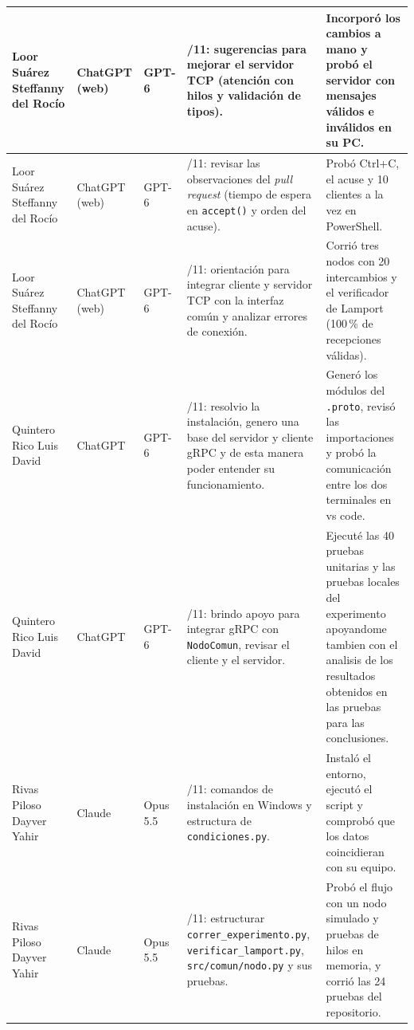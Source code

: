 {\begin{longtable}{@{}>{\raggedright\arraybackslash}p{2.2cm}>{\raggedright\arraybackslash}p{2.2cm}>{\raggedright\arraybackslash}p{1.6cm}>{\raggedright\arraybackslash}p{3.9cm}>{\raggedright\arraybackslash}p{3.9cm}@{}}
  \midrule
  Loor Suárez Steffanny del Rocío & ChatGPT (web) & GPT-6 & 19/11: sugerencias para mejorar el servidor TCP (atención con hilos y validación de tipos). & Incorporó los cambios a mano y probó el servidor con mensajes válidos e inválidos en su PC. \\
  \midrule
  Loor Suárez Steffanny del Rocío & ChatGPT (web) & GPT-6 & 20/11: revisar las observaciones del \emph{pull request} (tiempo de espera en \texttt{accept()} y orden del acuse). & Probó Ctrl+C, el acuse y 10 clientes a la vez en PowerShell. \\
  \midrule
  Loor Suárez Steffanny del Rocío & ChatGPT (web) & GPT-6 & 21/11: orientación para integrar cliente y servidor TCP con la interfaz común y analizar errores de conexión. & Corrió tres nodos con 20 intercambios y el verificador de Lamport (100\,\% de recepciones válidas). \\
  \midrule
  Quintero Rico Luis David & ChatGPT & GPT-6 & 19/11: resolvio la instalación, genero una base del servidor y cliente gRPC y de esta manera poder entender su funcionamiento. & Generó los módulos del \texttt{.proto}, revisó las importaciones y probó la comunicación entre los dos terminales en vs code. \\
  \midrule
  Quintero Rico Luis David & ChatGPT & GPT-6 & 22/11: brindo apoyo para integrar gRPC con \texttt{NodoComun}, revisar el cliente y el servidor. & Ejecuté las 40 pruebas unitarias y las pruebas locales del experimento apoyandome tambien con el analisis de los resultados obtenidos en las pruebas para las conclusiones.\\
  \midrule
  Rivas Piloso Dayver Yahir & Claude & Opus 5.5 & 18/11: comandos de instalación en Windows y estructura de \texttt{condiciones.py}. & Instaló el entorno, ejecutó el script y comprobó que los datos coincidieran con su equipo. \\
  \midrule
  Rivas Piloso Dayver Yahir & Claude & Opus 5.5 & 20/11: estructurar \texttt{correr\_experimento.py}, \texttt{verificar\_lamport.py}, \texttt{src/comun/nodo.py} y sus pruebas. & Probó el flujo con un nodo simulado y pruebas de hilos en memoria, y corrió las 24 pruebas del repositorio. \\
  \bottomrule
\end{longtable}
}
